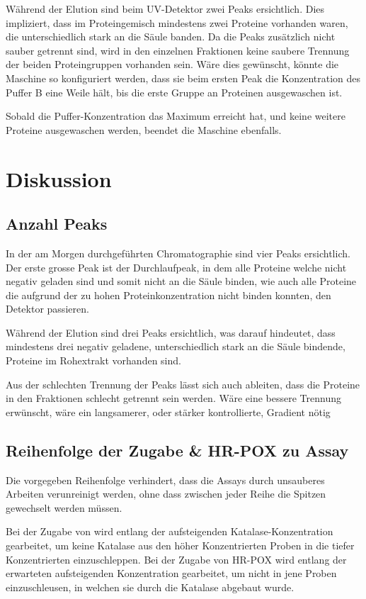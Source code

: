 \documentclass[a4paper,german]{scrreprt}
\begin{document}
Während der Elution sind beim UV-Detektor zwei Peaks ersichtlich. Dies
impliziert, dass im Proteingemisch mindestens zwei Proteine vorhanden waren,
die unterschiedlich stark an die Säule banden. Da die Peaks zusätzlich nicht
sauber getrennt sind, wird in den einzelnen Fraktionen keine saubere Trennung
der beiden Proteingruppen vorhanden sein. Wäre dies gewünscht, könnte die
Maschine so konfiguriert werden, dass sie beim ersten Peak die Konzentration
des Puffer B eine Weile hält, bis die erste Gruppe an Proteinen ausgewaschen
ist.

Sobald die Puffer-Konzentration das Maximum erreicht hat, und keine weitere
Proteine ausgewaschen werden, beendet die Maschine ebenfalls.

\chapter{Diskussion}

\section{Anzahl Peaks}

In der am Morgen durchgeführten Chromatographie sind vier Peaks ersichtlich.
Der erste grosse Peak ist der Durchlaufpeak, in dem alle Proteine welche nicht
negativ geladen sind und somit nicht an die Säule binden, wie auch alle
Proteine die aufgrund der zu hohen Proteinkonzentration nicht binden konnten,
den Detektor passieren.

Während der Elution sind drei Peaks ersichtlich, was darauf hindeutet, dass
mindestens drei negativ geladene, unterschiedlich stark an die Säule bindende,
Proteine im Rohextrakt vorhanden sind.

Aus der schlechten Trennung der Peaks lässt sich auch ableiten, dass die
Proteine in den Fraktionen schlecht getrennt sein werden. Wäre eine bessere
Trennung erwünscht, wäre ein langsamerer, oder stärker kontrollierte, Gradient nötig

\section{Reihenfolge der Zugabe  \& HR-POX zu Assay}

Die vorgegeben Reihenfolge verhindert, dass die Assays durch unsauberes
Arbeiten verunreinigt werden, ohne dass zwischen jeder Reihe die Spitzen
gewechselt werden müssen.

Bei der Zugabe von  wird entlang der aufsteigenden
Katalase-Konzentration gearbeitet, um keine Katalase aus den höher
Konzentrierten Proben in die tiefer Konzentrierten einzuschleppen. Bei der
Zugabe von HR-POX wird entlang der erwarteten aufsteigenden 
Konzentration gearbeitet, um nicht  in jene Proben einzuschleusen, in
welchen sie durch die Katalase abgebaut wurde.
\end{document}
